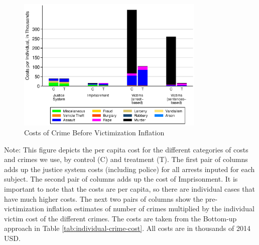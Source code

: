 \documentclass[static]{JJH-Beamer}
\begin{document}
\begin{frame}
 \addtocounter{framenumber}{-1}

\begin{figure} [H]
\caption{Costs of Crime Before Victimization Inflation}\label{tab:diff-costs}
\begin{center}
\includegraphics[width=0.8\textwidth]{AppOutput/Crime/different_costs}
\end{center}
\end{figure}

\end{frame}

{\flushleft \normalsize Note: This figure depicts the per capita cost for the different categories of costs and crimes we use, by control (C) and treatment (T). The first pair of columns adds up the justice system costs (including police) for all arrests inputed for each subject. The second pair of columns adds up the cost of Imprisonment. It is important to note that the costs are per capita, so there are individual cases that have much higher costs. The next two pairs of columns show the pre-victimization inflation estimates of number of crimes multiplied by the individual victim cost of the different crimes. The costs are taken from the Bottom-up approach in Table \ref{tab:individual-crime-cost}. All costs are in thousands of 2014 USD.\\}
\end{document}
